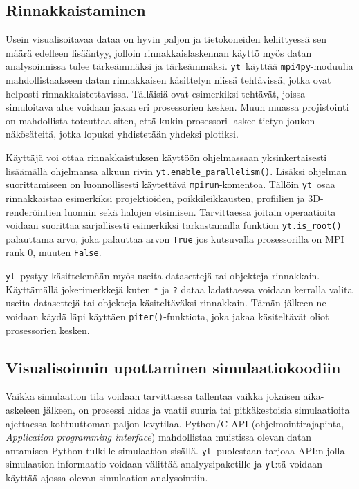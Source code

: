 \documentclass[12pt,a4paper]{article}
\newcommand{\yt}{\texttt{yt}}
\begin{document}
\subsection{Rinnakkaistaminen}
Usein visualisoitavaa dataa on hyvin paljon ja tietokoneiden kehittyessä sen määrä edelleen lisääntyy, jolloin rinnakkaislaskennan käyttö myös datan analysoinnissa tulee tärke\-äm\-mäksi ja tärkeämmäksi. \yt\ käyttää \texttt{mpi4py}-moduulia mahdollistaakseen datan rinnakkaisen käsittelyn niissä tehtävissä, jotka ovat helposti rinnakkaistettavissa. Tälläisiä ovat esimerkiksi tehtävät, joissa simuloitava alue voidaan jakaa eri prosessorien kesken. Muun muassa projistointi on mahdollista toteuttaa siten, että kukin prosessori laskee tietyn joukon näkösäteitä, jotka lopuksi yhdistetään yhdeksi plotiksi. \cite{yt}

Käyttäjä voi ottaa rinnakkaistuksen käyttöön ohjelmassaan yksinkertaisesti lisäämällä ohjelmansa alkuun rivin \texttt{yt.enable\_parallelism()}. Lisäksi ohjelman suorittamiseen on luonnollisesti käytettävä \texttt{mpirun}-komentoa. Tällöin \yt\ osaa rinnakkaistaa esimerkiksi projektioiden, poikkileikkausten, profiilien ja 3D-renderöintien luonnin sekä halojen etsimisen. Tarvittaessa joitain operaatioita voidaan suorittaa sarjallisesti esimerkiksi tarkastamalla funktion \texttt{yt.is\_root()} palauttama arvo, joka palauttaa arvon \texttt{True} jos kutsuvalla prosessorilla on MPI rank 0, muuten \texttt{False}. \cite{yt, parallel}

\yt\ pystyy käsittelemään myös useita datasettejä tai objekteja rinnakkain. Käyttämällä jokerimerkkejä kuten \texttt{*} ja \texttt{?} dataa ladattaessa voidaan kerralla valita useita datasettejä tai objekteja käsiteltäväksi rinnakkain. Tämän jälkeen ne voidaan käydä läpi käyttäen \texttt{piter()}-funktiota, joka jakaa käsiteltävät oliot prosessorien kesken. \cite{parallel}

\subsection{Visualisoinnin upottaminen simulaatiokoodiin}
Vaikka simulaation tila voidaan tarvittaessa tallentaa vaikka jokaisen aika-askeleen jälkeen, on prosessi hidas ja vaatii suuria tai pitkäkestoisia simulaatioita ajettaessa kohtuuttoman paljon levytilaa. Python/C API (ohjelmointirajapinta, \textit{Application programming interface}) mahdollistaa muistissa olevan datan antamisen Python-tulkille simulaation sisällä. \yt\ puolestaan tarjoaa API:n jolla simulaation informaatio voidaan välittää analyysipaketille ja \yt :tä voidaan käyttää ajossa olevan simulaation analysointiin. \cite{yt}
\end{document}

